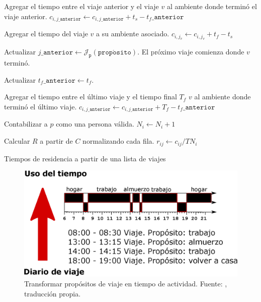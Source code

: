 \begin{algorithm}[H]
{{{            Agregar el tiempo entre el viaje anterior y el viaje \(v\) al ambiente donde terminó el viaje anterior. \(c_{i, j\_\mathtt{anterior}} \gets c_{i, j\_\mathtt{anterior}} + t_s - t_f\_\mathtt{anterior}\)\;
            
            Agregar el tiempo del viaje \(v\) a su ambiente asociado. \(c_{i, j_v} \gets c_{i, j_v} + t_f - t_s\)\;
            
            Actualizar  \(j\_\mathtt{anterior} \gets \mathcal{J}_{\mathtt{p}}(\mathtt{prop\acute{o}sito})\). El próximo viaje comienza donde \(v\) terminó.
            
            Actualizar \(t_f\_\mathtt{anterior} \gets t_f\). 
        }
        
        Agregar el tiempo entre el último viaje y el tiempo final \(T_f\) \(v\) al ambiente donde terminó el último viaje. \(c_{i, j\_\mathtt{anterior}} \gets c_{i, j\_\mathtt{anterior}} + T_f - t_f\_\mathtt{anterior}\)\;
        
        Contabilizar a \(p\) como una persona válida. \(N_i \gets N_i + 1\)\;
    }
    
}

Calcular \(R\) a partir de \(C\) normalizando cada fila. \(r_{ij} \gets c_{ij} / T N_i\)\;

\caption{Tiempos de residencia a partir de una lista de viajes}
\label{alg:timematrix}
\end{algorithm}

\begin{figure}[H]
\centering
\includegraphics[width=.6\linewidth]{img/metodologia/matrizPnormal/ciclo-viajes.eps}
\caption[Transformar propósitos de viaje en tiempo de actividad.]{Transformar propósitos de viaje en tiempo de actividad. Fuente: \cite{Munizaga2011}, traducción propia.}
\label{img:ciclo-viajes}
\end{figure}


